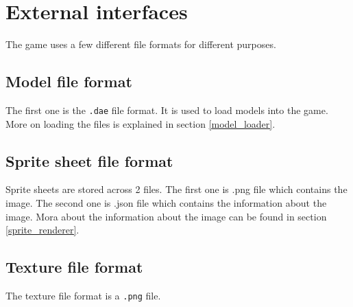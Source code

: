 \section{External interfaces}

The game uses a few different file formats for different purposes.

\subsection{Model file format}
The first one is the \texttt{.dae} file format.
It is used to load models into the game.
More on loading the files is explained in section \ref{model_loader}.

\subsection{Sprite sheet file format}
Sprite sheets are stored across 2 files. 
The first one is .png file which contains the image.
The second one is .json file which contains the information about the image.
Mora about the information about the image can be found in section \ref{sprite_renderer}.

\subsection{Texture file format}
The texture file format is a \texttt{.png} file.